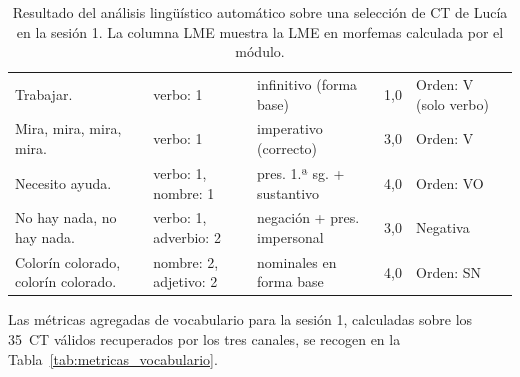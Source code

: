 \begin{table}[h]
  \footnotesize
  \renewcommand{\arraystretch}{1.3}
  \setlength{\tabcolsep}{3pt}
  \begin{center}
  \begin{tabular}{|L{3.5cm}|L{1.8cm}|L{2.0cm}|L{1.0cm}|L{3.8cm}|}
  \hline
   &  &  &  &  \\ \hline
  Trabajar.
    & verbo: 1
    & infinitivo (forma base)
    & 1{,}0
    & Orden: V (solo verbo) \\ \hline
  Mira, mira, mira, mira.
    & verbo: 1
    & imperativo (correcto)
    & 3{,}0
    & Orden: V \\ \hline
  Necesito ayuda.
    & verbo: 1, nombre: 1
    & pres. 1.ª sg. + sustantivo
    & 4{,}0
    & Orden: VO \\ \hline
  No hay nada, no hay nada.
    & verbo: 1, adverbio: 2
    & negación + pres. impersonal
    & 3{,}0
    & Negativa \\ \hline
  Colorín colorado, colorín colorado.
    & nombre: 2, adjetivo: 2
    & nominales en forma base
    & 4{,}0
    & Orden: SN \\ \hline
  \end{tabular}
  \end{center}
  \caption[Análisis lingüístico de \ac{CT} seleccionados]{Resultado del análisis
    lingüístico automático sobre una selección de \ac{CT} de Lucía en la sesión 1.
    La columna LME muestra la \ac{LME} en morfemas calculada por el módulo.}
  \label{tab:nlp_ejemplos}
\end{table}

Las métricas agregadas de vocabulario para la sesión 1, calculadas sobre los 35~\ac{CT}
válidos recuperados por los tres canales, se recogen en la
Tabla~\ref{tab:metricas_vocabulario}.

